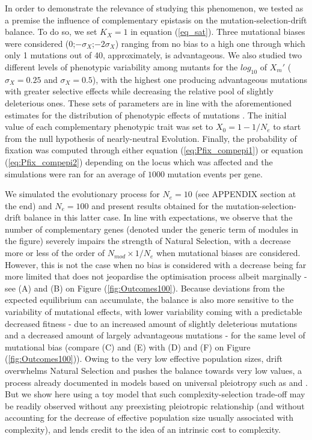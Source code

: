 \documentclass[11pt,onecolumn]{article}
\begin{document}
In order to demonstrate the relevance of studying this phenomenon, we tested as a premise the influence of complementary epistasis on the mutation-selection-drift balance. To do so, we set $K_X=1$ in equation (\ref{eq_sat}). Three mutational biases were considered ($0$;$-\sigma_X$;$-2\sigma_X$) ranging from no bias to a high one through which only 1 mutations out of 40, approximately, is advantageous. We also studied two different levels of phenotypic variability among mutants for the $log_{10}$ of $X_m'$ ($\sigma_X=0.25$ and $\sigma_X=0.5$), with the highest one producing advantageous mutations with greater selective effects while decreasing the relative pool of slightly deleterious ones. These sets of parameters are in line with the aforementioned estimates for the distribution of phenotypic effects of mutations \citep{Carlin16,Metzger16}. The initial value of each complementary phenotypic trait was set to $X_0=1-1/N_e$ to start from the null hypothesis of nearly-neutral Evolution. Finally, the probability of fixation was computed through either equation (\ref{eq:Pfix_compepi1}) or equation (\ref{eq:Pfix_compepi2}) depending on the locus which was affected and the simulations were ran for an average of $1000$ mutation events per gene.

We simulated the evolutionary process for $N_e=10$ (see APPENDIX section at the end) and $N_e=100$ and present results obtained for the mutation-selection-drift balance in this latter case. In line with expectations, we observe that the number of complementary genes (denoted under the generic term of modules in the figure) severely impairs the strength of Natural Selection, with a decrease more or less of the order of $N_{mod}\times 1/N_e$ when mutational biases are considered. However, this is not the case when no bias is considered with a decrease being far more limited that does not jeopardise the optimisation process albeit marginally - see (A) and (B) on Figure (\ref{fig:Outcomes100}). Because deviations from the expected equilibrium can accumulate, the balance is also more sensitive to the variability of mutational effects, with lower variability coming with a predictable decreased fitness - due to an increased amount of slightly deleterious mutations and a decreased amount of largely advantageous mutations - for the same level of mutational bias (compare (C) and (E) with (D) and (F) on Figure (\ref{fig:Outcomes100})). Owing to the very low effective population sizes, drift overwhelms Natural Selection and pushes the balance towards very low values, a process already documented in models based on universal pleiotropy such as \citep{Hartl96} and \citep{Poon00}. But we show here using a toy model that such complexity-selection trade-off may be readily observed without any preexisting pleiotropic relationship (and without accounting for the decrease of effective population size usually associated with complexity), and lends credit to the idea of an intrinsic cost to complexity.
\end{document}

